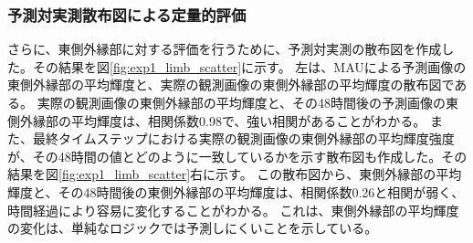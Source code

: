       \subsubsection{予測対実測散布図による定量的評価}
        さらに、東側外縁部に対する評価を行うために、予測対実測の散布図を作成した。その結果を図\ref{fig:exp1_limb_scatter}に示す。
        左は、MAUによる予測画像の東側外縁部の平均輝度と、実際の観測画像の東側外縁部の平均輝度の散布図である。
        実際の観測画像の東側外縁部の平均輝度と、その48時間後の予測画像の東側外縁部の平均輝度は、相関係数0.98で、強い相関があることがわかる。
        また、最終タイムステップにおける実際の観測画像の東側外縁部の平均輝度強度が、その48時間の値とどのように一致しているかを示す散布図も作成した。その結果を図\ref{fig:exp1_limb_scatter}右に示す。
        この散布図から、東側外縁部の平均輝度と、その48時間後の東側外縁部の平均輝度は、相関係数0.26と相関が弱く、時間経過により容易に変化することがわかる。
        これは、東側外縁部の平均輝度の変化は、単純なロジックでは予測しにくいことを示している。

